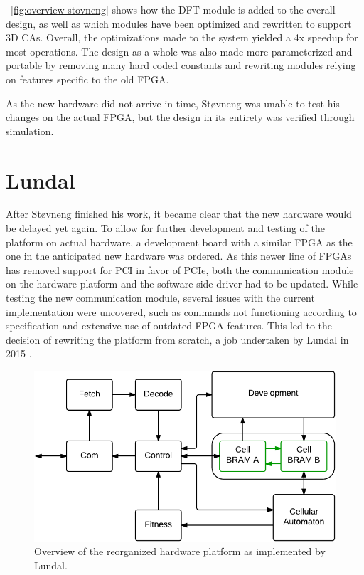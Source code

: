 \figurename~\ref{fig:overview-stovneng} shows how the DFT module is added to the
overall design, as well as which modules have been optimized and rewritten to
support 3D CAs. Overall, the optimizations made to the system yielded a 4x
speedup for most operations. The design as a whole was also made more
parameterized and portable by removing many hard coded constants and rewriting
modules relying on features specific to the old FPGA.

As the new hardware did not arrive in time, Støvneng was unable to test his
changes on the actual FPGA, but the design in its entirety was verified through
simulation.

\section{Lundal}

After Støvneng finished his work, it became clear that the new hardware would be
delayed yet again. To allow for further development and testing of the platform
on actual hardware, a development board with a similar FPGA as the one in the
anticipated new hardware was ordered. As this newer line of FPGAs has removed
support for PCI in favor of PCIe, both the communication module on the hardware
platform and the software side driver had to be updated. While testing the new
communication module, several issues with the current implementation were uncovered,
such as commands not functioning according to specification and extensive use of
outdated FPGA features. This led to the decision of rewriting the platform from
scratch, a job undertaken by Lundal in 2015 \cite{Lundal2015a}.


\begin{figure}[ht]
  \centering
  \includegraphics[width=0.8\linewidth]{fig/lundal-implementation-simple}
  \caption{
    Overview of the reorganized hardware platform as implemented by
    Lundal. \label{fig:lundal-implementation-simple}
  }
\end{figure}

